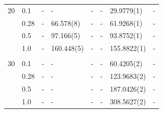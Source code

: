 \begin{table} [H]
\begin{tabularx}{\textwidth}{l:l|XXXXXX}
		20 & 0.1 & - & - & - & - & 29.9779(1) & - \\ 
		& 0.28 & - & 66.578(8) & - & - & 61.9268(1) & - \\
		& 0.5 & - & 97.166(5) & - & - & 93.8752(1) & - \\
		& 1.0 & - & 160.448(5) & - & - & 155.8822(1) & - \\ \hdashline \\
		
		30 & 0.1 & - & - & - & - & 60.4205(2) & -\\ 
		& 0.28 & - & - & - & - & 123.9683(2) & - \\
		& 0.5 & - & - & - & - & 187.0426(2) & -\\
		& 1.0 & - & - & - & - & 308.5627(2) & -\\ \hline\hline
	\end{tabularx}
\end{table}

